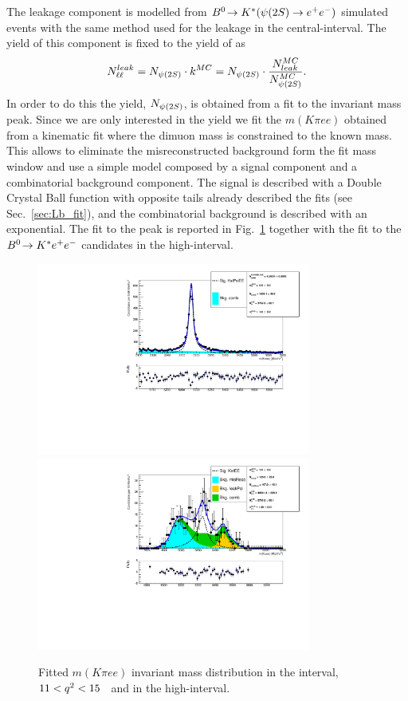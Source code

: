 The \psitwos leakage component is modelled from $\decay{\Bz}{\Kstar(\psitwos\to\ee)}$
simulated events with the same method used for the \jpsi leakage in the central-\qsq interval.
The yield of this component is fixed to the yield of \psitwos as
\begin{equation}
N_{\ell\ell}^{leak} = N_{\psitwos} \cdot k^{MC} = N_{\psitwos} \cdot \frac{N_{leak}^{MC}}{N_{\psitwos}^{MC}}.
\end{equation}
 In order to do this the \psitwos yield, $N_{\psitwos}$, is obtained from a fit to the \psitwos invariant
 mass peak. Since we are only interested in the \psitwos yield we fit the $m(K\pi ee)$ obtained from
 a kinematic fit where the dimuon mass is constrained to the known \psitwos mass.
 This allows to eliminate the misreconstructed background form the fit mass window and
 use a simple model composed by a signal component and a combinatorial background component.
 The signal is described with a Double Crystal Ball function with opposite tails
 already described the \Lb fits (see Sec.~\ref{sec:Lb_fit}), and the combinatorial
 background is described with an exponential.
 The fit to the \psitwos peak is reported in Fig.~\ref{fig:fit_ee_highq2}
 together with the fit to the ${{B}^0}\!\rightarrow {\ensuremath{{K}^*}} e^+ e^-$ candidates in the high-\qsq interval.
 
\begin{figure}[h!]
\centering
\includegraphics[width=0.8\textwidth]{RKst/figs/fit_EEs_0_EE-q2high-gmc/KstPsiEE_L0E_fitAndRes.pdf}
\includegraphics[width=0.8\textwidth]{RKst/figs/fit_EEs_0_EE-q2high-gmc/KstEE_L0E_fitAndRes.pdf}
\caption{Fitted $m(K\pi ee)$ invariant mass distribution in the \psitwos interval, $11 < {q^2} < 15$~\gevgevcccc
and in the high-\qsq interval. }
\label{fig:fit_ee_highq2}
\end{figure}

